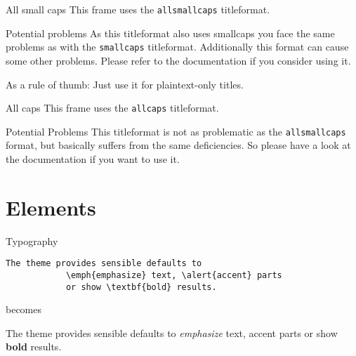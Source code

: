 \documentclass[10pt]{beamer}
\begin{document}
	{
		\begin{frame}{All small caps}
			This frame uses the \texttt{allsmallcaps} titleformat.
			
			\begin{alertblock}{Potential problems}
				As this titleformat also uses smallcaps you face the same problems as with the \texttt{smallcaps} titleformat. Additionally this format can cause some other problems. Please refer to the documentation if you consider using it.
				
				As a rule of thumb: Just use it for plaintext-only titles.
			\end{alertblock}
		\end{frame}
	}
	
	{
		\begin{frame}{All caps}
			This frame uses the \texttt{allcaps} titleformat.
			
			\begin{alertblock}{Potential Problems}
				This titleformat is not as problematic as the \texttt{allsmallcaps} format, but basically suffers from the same deficiencies. So please have a look at the documentation if you want to use it.
			\end{alertblock}
		\end{frame}
	}
	
	\section{Elements}
	
	\begin{frame}[fragile]{Typography}
		\begin{verbatim}The theme provides sensible defaults to
			\emph{emphasize} text, \alert{accent} parts
			or show \textbf{bold} results.\end{verbatim}
		
		\begin{center}becomes\end{center}
		
		The theme provides sensible defaults to \emph{emphasize} text,
		\alert{accent} parts or show \textbf{bold} results.
	\end{frame}
	
\end{document}
